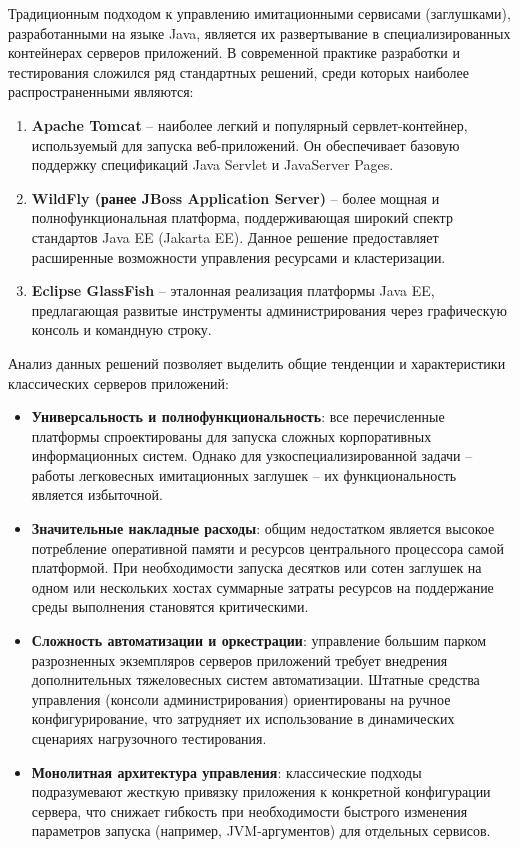 \documentclass[
]{article}
\begin{document}
Традиционным подходом к управлению имитационными сервисами (заглушками),
разработанными на языке Java, является их развертывание в
специализированных контейнерах серверов приложений. В современной
практике разработки и тестирования сложился ряд стандартных решений,
среди которых наиболее распространенными являются:

\begin{enumerate}
\def\labelenumi{\arabic{enumi}.}
\item
  \textbf{Apache Tomcat} -- наиболее легкий и популярный
  сервлет-контейнер, используемый для запуска веб-приложений. Он
  обеспечивает базовую поддержку спецификаций Java Servlet и JavaServer
  Pages.
\item
  \textbf{WildFly (ранее JBoss Application Server)} -- более мощная и
  полнофункциональная платформа, поддерживающая широкий спектр
  стандартов Java EE (Jakarta EE). Данное решение предоставляет
  расширенные возможности управления ресурсами и кластеризации.
\item
  \textbf{Eclipse GlassFish} -- эталонная реализация платформы Java EE,
  предлагающая развитые инструменты администрирования через графическую
  консоль и командную строку.
\end{enumerate}

Анализ данных решений позволяет выделить общие тенденции и
характеристики классических серверов приложений:

\begin{itemize}
\item
  \textbf{Универсальность и полнофункциональность}: все перечисленные
  платформы спроектированы для запуска сложных корпоративных
  информационных систем. Однако для узкоспециализированной задачи --
  работы легковесных имитационных заглушек -- их функциональность
  является избыточной.
\item
  \textbf{Значительные накладные расходы}: общим недостатком является
  высокое потребление оперативной памяти и ресурсов центрального
  процессора самой платформой. При необходимости запуска десятков или
  сотен заглушек на одном или нескольких хостах суммарные затраты
  ресурсов на поддержание среды выполнения становятся критическими.
\item
  \textbf{Сложность автоматизации и оркестрации}: управление большим
  парком разрозненных экземпляров серверов приложений требует внедрения
  дополнительных тяжеловесных систем автоматизации. Штатные средства
  управления (консоли администрирования) ориентированы на ручное
  конфигурирование, что затрудняет их использование в динамических
  сценариях нагрузочного тестирования.
\item
  \textbf{Монолитная архитектура управления}: классические подходы
  подразумевают жесткую привязку приложения к конкретной конфигурации
  сервера, что снижает гибкость при необходимости быстрого изменения
  параметров запуска (например, JVM-аргументов) для отдельных сервисов.
\end{itemize}
\end{document}
